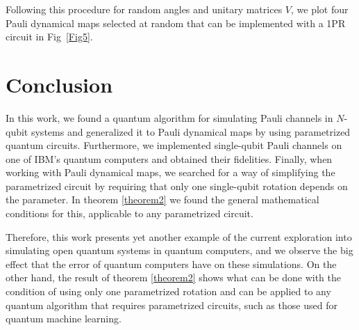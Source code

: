 \documentclass[10pt,letterpaper]{article} %
\newcommand{\fref}[1]{Fig~\ref{#1}}
\begin{document}
Following this procedure for random
angles and unitary matrices $V$, 
we plot four Pauli dynamical maps  selected at random
that can be implemented with a 1PR circuit in \fref{Fig5}.

\section{Conclusion} %

In this work, we found a quantum algorithm for 
simulating Pauli channels in $N$-qubit systems and
generalized it to Pauli dynamical maps
by using parametrized quantum circuits.
Furthermore, we implemented single-qubit Pauli channels
on one of IBM's quantum computers
and obtained their fidelities. 
Finally, when working with Pauli dynamical maps,
we searched for a way of simplifying the parametrized circuit
by requiring that only one single-qubit rotation depends on the parameter.
In theorem \ref{theorem2} we found the general mathematical conditions for 
this, applicable to any parametrized circuit.

Therefore, this work presents yet another example of the current
exploration into simulating open quantum
systems in quantum computers,
and we observe the big effect that the error of quantum computers have
on these simulations.
On the other hand, the result
of theorem \ref{theorem2}
shows what can be done with the condition of using only one
parametrized rotation and
can be applied to any quantum algorithm that requires parametrized circuits,
such as those used for quantum machine learning.

\end{document}
